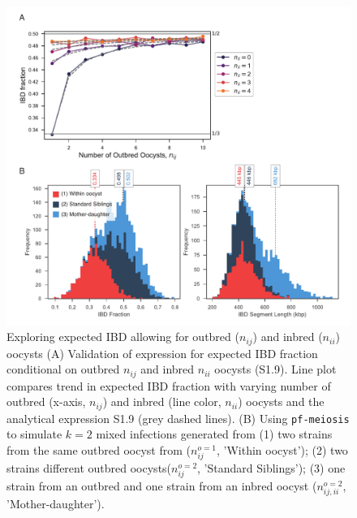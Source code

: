 \documentclass[9pt,lineno]{elife}
\begin{document}
\begin{figure}[ht]
  \centering{}
  \includegraphics[width = .85\textwidth]{supp-Fig2.pdf}
  \caption{Exploring expected IBD allowing for outbred ($n_{ij}$) and inbred ($n_{ii}$) oocysts (A) Validation of expression for expected IBD fraction conditional on outbred $n_{ij}$ and inbred $n_{ii}$ oocysts (S1.9). Line plot compares trend in expected IBD fraction with varying number of outbred (x-axis, $n_{ij}$) and inbred (line color, $n_{ii}$) oocysts and the analytical expression S1.9 (grey dashed lines). (B) Using \texttt{pf-meiosis} to simulate $k=2$ mixed infections generated from (1) two strains from the same outbred oocyst from ($n^{o=1}_{ij}$, 'Within oocyst'); (2) two strains different outbred oocysts($n^{o=2}_{ij}$, 'Standard Siblings'); (3) one strain from an outbred and one strain from an inbred oocyst ($n^{o=2}_{ij, ii}$, 'Mother-daughter').} \label{fig:validinbred}
\end{figure}






\end{document}

